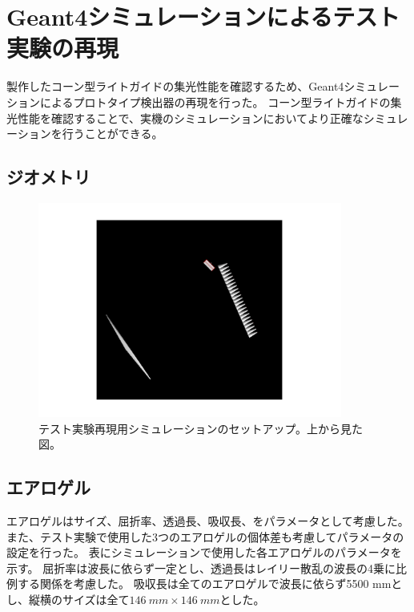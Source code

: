 \section{Geant4シミュレーションによるテスト実験の再現}
製作したコーン型ライトガイドの集光性能を確認するため、Geant4シミュレーションによるプロトタイプ検出器の再現を行った。
コーン型ライトガイドの集光性能を確認することで、実機のシミュレーションにおいてより正確なシミュレーションを行うことができる。

\subsection{ジオメトリ}

\begin{figure}[htbp]
  \centering
  \includegraphics[width=10cm, page=1]{images/chapter4/ELPHsimulationSetup.pdf}
  \caption{テスト実験再現用シミュレーションのセットアップ。上から見た図。}
  \label{fig:ELPHsimulationSetup1}
\end{figure}

\subsection{エアロゲル}
エアロゲルはサイズ、屈折率、透過長、吸収長、をパラメータとして考慮した。
また、テスト実験で使用した3つのエアロゲルの個体差も考慮してパラメータの設定を行った。
表にシミュレーションで使用した各エアロゲルのパラメータを示す。
屈折率は波長に依らず一定とし、透過長はレイリー散乱の波長の4乗に比例する関係を考慮した。
吸収長は全てのエアロゲルで波長に依らず5500 mmとし、縦横のサイズは全て$\SI{146}{mm}\times\SI{146}{mm}$とした。

